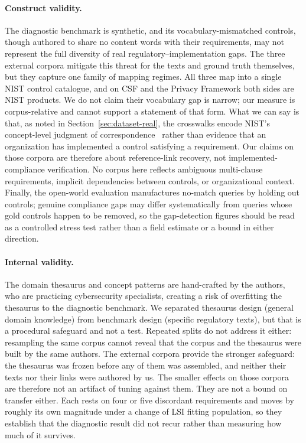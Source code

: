 \documentclass[a4paper,fleqn]{cas-sc}
\begin{document}
\paragraph{Construct validity.}
The diagnostic benchmark is synthetic, and its vocabulary-mismatched controls, though authored to share no content words with their requirements, may not represent the full diversity of real regulatory--implementation gaps.
The three external corpora mitigate this threat for the texts and ground truth themselves, but they capture one family of mapping regimes. All three map into a single NIST control catalogue, and on CSF and the Privacy Framework both sides are NIST products. We do not claim their vocabulary gap is narrow; our measure is corpus-relative and cannot support a statement of that form. What we can say is that, as noted in Section~\ref{sec:dataset-real}, the crosswalks encode NIST's concept-level judgment of correspondence~\citep{NISTIR8477} rather than evidence that an organization has implemented a control satisfying a requirement.
Our claims on those corpora are therefore about reference-link recovery, not implemented-compliance verification.
No corpus here reflects ambiguous multi-clause requirements, implicit dependencies between controls, or organizational context.
Finally, the open-world evaluation manufactures no-match queries by holding out controls; genuine compliance gaps may differ systematically from queries whose gold controls happen to be removed, so the gap-detection figures should be read as a controlled stress test rather than a field estimate or a bound in either direction.

\paragraph{Internal validity.}
The domain thesaurus and concept patterns are hand-crafted by the authors, who are practicing cybersecurity specialists, creating a risk of overfitting the thesaurus to the diagnostic benchmark.
We separated thesaurus design (general domain knowledge) from benchmark design (specific regulatory texts), but that is a procedural safeguard and not a test. Repeated splits do not address it either: resampling the same corpus cannot reveal that the corpus and the thesaurus were built by the same authors.
The external corpora provide the stronger safeguard: the thesaurus was frozen before any of them was assembled, and neither their texts nor their links were authored by us.
The smaller effects on those corpora are therefore not an artifact of tuning against them. They are not a bound on transfer either. Each rests on four or five discordant requirements and moves by roughly its own magnitude under a change of LSI fitting population, so they establish that the diagnostic result did not recur rather than measuring how much of it survives.
\end{document}
